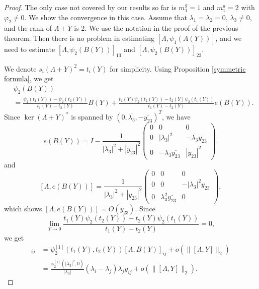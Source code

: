 \documentclass[12pt]{article}
\theoremstyle{definition}
\numberwithin{equation}{section}
\begin{document}
\begin{proof}
The only case not covered by our results so far is $m^g_1=1$ and $m^a_1=2$ with $\varphi_2\neq 0$. 
We show the convergence in this case. 
Assume that $\lambda_1=\lambda_2=0$, $\lambda_3\neq 0$, and the rank of $\Lambda+Y$ is 2. 
We use the notation in the proof of the previous theorem. 
Then there is no problem in estimating $[\Lambda,\psi_1(A(Y))]$, and 
we need to estimate $[\Lambda,\psi_2(B(Y))]_{13}$ and $[\Lambda,\psi_2(B(Y))]_{23}$. 

We denote $s_i(\Lambda+Y)^2=t_i(Y)$ for simplicity. 
Using Proposition \ref{symmetric formula}, we get 
\begin{align*}
	&\psi_2(B(Y))  \\
	&= \frac{\psi_2(t_1(Y))-\psi_2(t_2(Y))}{t_1(Y)-t_2(Y)}B(Y)+\frac{t_1(Y)\psi_2(t_2(Y))-t_2(Y)\psi_2(t_1(Y))}{t_1(Y)-t_2(Y)}e(B(Y)).
\end{align*}
Since $\ker(\Lambda+Y)^*$ is spanned by $(0,\overline{\lambda_3},-\overline{y_{23}})^T$, we have
\[e(B(Y))=I-\frac{1}{|\lambda_3|^2+|y_{23}|^2}\begin{pmatrix}
	0 & 0 & 0 \\
	0 & |\lambda_3|^2 & -\overline{\lambda_3}y_{23} \\
	0 & -\lambda_3\overline{y_{23}} & |y_{23}|^2
\end{pmatrix}.\]
and 
\[[\Lambda,e(B(Y))]=
\frac{1}{|\lambda_3|^2+|y_{23}|^2}\begin{pmatrix}
	0 & 0 & 0 \\
	0 & 0 & -|\lambda_3|^2y_{23} \\
	0 & \lambda_3^2\overline{y_{23}} & 0
\end{pmatrix},\]
which shows $[\Lambda,e(B(Y))]=O(y_{23})$.
Since 
\[\lim_{Y\to 0}\frac{t_1(Y)\psi_2(t_2(Y))-t_2(Y)\psi_2(t_1(Y))}{t_1(Y)-t_2(Y)}=0,\]
we get 
\begin{align*}
	[\Lambda,\psi_2(B(\Lambda))]_{ij}&=\psi_2^{[1]}(t_1(Y),t_2(Y))[\Lambda,B(Y)]_{ij}+o(\|[\Lambda,Y]\|_2) \\
	&=\frac{\varphi_2^{[1]}(|\lambda_3|^2,0)}{|\lambda_3|}(\lambda_i-\lambda_j)\overline{\lambda_j}y_{ij}+o(\|[\Lambda,Y]\|_2).  
\end{align*}
\end{proof}  
\end{document}
